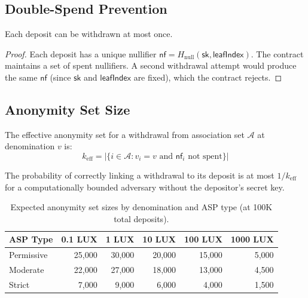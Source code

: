 \subsection{Double-Spend Prevention}

\begin{lemma}
Each deposit can be withdrawn at most once.
\end{lemma}

\begin{proof}
Each deposit has a unique nullifier $\mathsf{nf} = H_{\text{null}}(\mathsf{sk}, \mathsf{leafIndex})$. The contract maintains a set of spent nullifiers. A second withdrawal attempt would produce the same $\mathsf{nf}$ (since $\mathsf{sk}$ and $\mathsf{leafIndex}$ are fixed), which the contract rejects.
\end{proof}

\subsection{Anonymity Set Size}

\begin{definition}
The effective anonymity set for a withdrawal from association set $\mathcal{A}$ at denomination $v$ is:
\begin{equation}
    k_{\text{eff}} = |\{i \in \mathcal{A} : v_i = v \text{ and } \mathsf{nf}_i \text{ not spent}\}|
\end{equation}
\end{definition}

\begin{proposition}
The probability of correctly linking a withdrawal to its deposit is at most $1/k_{\text{eff}}$ for a computationally bounded adversary without the depositor's secret key.
\end{proposition}

\begin{table}[H]
\centering
\caption{Expected anonymity set sizes by denomination and ASP type (at 100K total deposits).}
\label{tab:anonymity}
\begin{tabular}{lrrrrr}
\toprule
\textbf{ASP Type} & \textbf{0.1 LUX} & \textbf{1 LUX} & \textbf{10 LUX} & \textbf{100 LUX} & \textbf{1000 LUX} \\
\midrule
Permissive & 25,000 & 30,000 & 20,000 & 15,000 & 5,000 \\
Moderate & 22,000 & 27,000 & 18,000 & 13,000 & 4,500 \\
Strict & 7,000 & 9,000 & 6,000 & 4,000 & 1,500 \\
\bottomrule
\end{tabular}
\end{table}

